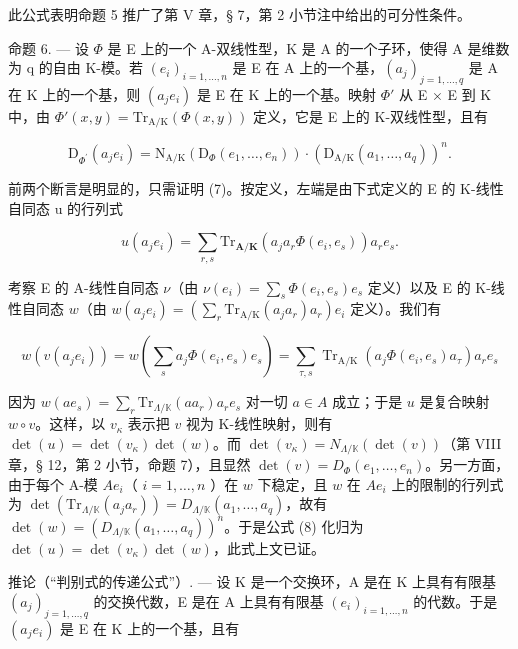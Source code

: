 此公式表明命题 5 推广了第 V 章，§ 7，第 2 小节注中给出的可分性条件。

命题 6. --- 设 \(\Phi\) 是 E 上的一个 A-双线性型，K 是 A 的一个子环，使得 A 是维数为 q 的自由 K-模。若 \((e_i)_{i=1,\ldots,n}\) 是 E 在 A 上的一个基，\((a_j)_{j=1,\ldots,q}\) 是 A 在 K 上的一个基，则 \((a_j e_i)\) 是 E 在 K 上的一个基。映射 \(\Phi'\) 从 E \(\times\) E 到 K 中，由 \(\Phi'(x,y)=\mathrm{Tr}_{\mathrm{A/K}}(\Phi(x,y))\) 定义，它是 E 上的 K-双线性型，且有

\[
\mathrm{D} _ {\Phi^ {\prime}} (a _ {j} e _ {i}) = \mathrm{N} _ {\mathrm{A} / \mathrm{K}} (\mathrm{D} _ {\Phi} (e _ {1}, \dots , e _ {n})) \cdot (\mathrm{D} _ {\mathrm{A} / \mathrm{K}} (a _ {1}, \dots , a _ {q})) ^ {n}.\tag{8}
\]

前两个断言是明显的，只需证明 (7)。按定义，左端是由下式定义的 E 的 K-线性自同态 u 的行列式

\[
u (a _ {j} e _ {i}) = \sum_ {r, s} \mathrm{Tr} _ {\mathbf {A} / \mathbf {K}} (a _ {j} a _ {r} \Phi (e _ {i}, e _ {s})) a _ {r} e _ {s}.
\]

考察 E 的 A-线性自同态 \(\nu\)（由 \(\nu(e_i) = \sum_s \Phi(e_i, e_s)e_s\) 定义）以及 E 的 K-线性自同态 \(w\)（由 \(w(a_j e_i) = (\sum_r \mathrm{Tr}_{\mathrm{A/K}}(a_j a_r)a_r)e_i\) 定义）。我们有

\[
w \left(v \left(a _ {j} e _ {i}\right)\right) = w \left(\sum_ {s} a _ {j} \Phi \left(e _ {i}, e _ {s}\right) e _ {s}\right) = \sum_ {\tau , s} \operatorname{Tr} _ {\mathrm{A} / \mathrm{K}} \left(a _ {j} \Phi \left(e _ {i}, e _ {s}\right) a _ {\tau}\right) a _ {r} e _ {s}
\]

因为 \(w(ae_s) = \sum_r \mathrm{Tr}_{\Lambda/\mathbb{K}}(aa_r)a_r e_s\) 对一切 \(a \in A\) 成立；于是 \(u\) 是复合映射 \(w \circ v\)。这样，以 \(v_{\kappa}\) 表示把 \(v\) 视为 K-线性映射，则有 \(\det(u) = \det(v_{\kappa})\det(w)\)。而 \(\det(v_{\kappa}) = N_{\Lambda/\mathbb{K}}(\det(v))\)（第 VIII 章，§ 12，第 2 小节，命题 7），且显然 \(\det(v) = D_{\Phi}(e_1, \ldots, e_n)\)。另一方面，由于每个 A-模 \(Ae_i\)（ \(i = 1, \ldots, n\) ）在 \(w\) 下稳定，且 \(w\) 在 \(Ae_i\) 上的限制的行列式为 \(\det(\mathrm{Tr}_{\Lambda/\mathbb{K}}(a_j a_r)) = D_{\Lambda/\mathbb{K}}(a_1, \ldots, a_q)\)，故有 \(\det(w) = (D_{\Lambda/\mathbb{K}}(a_1, \ldots, a_q))^n\)。于是公式 (8) 化归为 \(\det(u) = \det(v_{\kappa})\det(w)\)，此式上文已证。

推论（“判别式的传递公式”）. — 设 K 是一个交换环，A 是在 K 上具有有限基 \((a_{j})_{j=1,\ldots,q}\) 的交换代数，E 是在 A 上具有有限基 \((e_{i})_{i=1,\ldots,n}\) 的代数。于是 \((a_{j}e_{i})\) 是 E 在 K 上的一个基，且有

